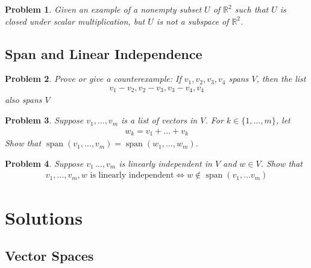 \documentclass[12pt]{article}
\newcommand{\R}{\mathbb{R}}
\DeclareMathOperator{\spn}{span}
\theoremstyle{problem}
\newtheorem{problem}{Problem}
\theoremstyle{remark}
\begin{document}
\begin{problem}
    Given an example of a nonempty subset $U$ of $\R^2$ such that $U$ is closed under scalar multiplication, but $U$ is not a subspace of $\R^2$.
\end{problem}

\subsection{Span and Linear Independence}

\begin{problem}
    Prove or give a counterexample: If $v_1,v_2,v_3,v_4$ spans $V$, then the list 
    \begin{align*}
        v_1-v_2, v_2-v_3,v_3-v_4,v_4
    \end{align*}
    also spans $V$
\end{problem}

\begin{problem}
    Suppose $v_1, \ldots, v_m$ is a list of vectors in $V$. For $k \in \{1,\ldots,m\}$, let 
    \begin{align*}
        w_k = v_1 + \ldots + v_k
    \end{align*}
    Show that $\spn(v_1, \ldots,v_m) = \spn(w_1, \ldots, w_m)$.
\end{problem}
\begin{problem}
    Suppose $v_1 \, \ldots ,v_m$ is linearly independent in $V$ and $w \in V$. Show that 
    \begin{align*}
        v_1,\ldots,v_m,w \text{ is linearly independent} \iff w \not\in \spn(v_1, \ldots v_m)
    \end{align*}
\end{problem}

\newpage
\section{Solutions}
\subsection{Vector Spaces}
\end{document}
